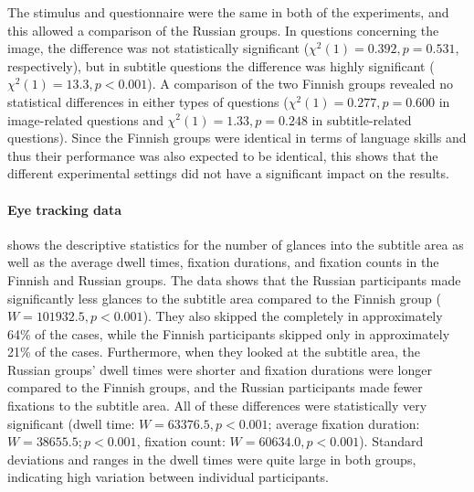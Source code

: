 \documentclass[output=paper]{langsci/langscibook}
\begin{document}
\newpage 
The stimulus and questionnaire were the same in both of the experiments, and this allowed a comparison of the Russian groups. In questions concerning the image, the difference was not statistically significant (${\chi}^2(1) = 0.392, p = 0.531$, respectively), but in subtitle questions the difference was highly significant (${\chi}^2(1) = 13.3, p < 0.001$). A comparison of the two Finnish groups revealed no statistical differences in either types of questions (${\chi}^2(1) = 0.277, p = 0.600$ in image-related questions and ${\chi}^2(1) = 1.33, p = 0.248$ in subtitle-related questions). Since the Finnish groups were identical in terms of language skills and thus their performance was also expected to be identical, this shows that the different experimental settings did not have a significant impact on the results.

\paragraph{Eye tracking data}

   shows the descriptive statistics for the number of glances into the subtitle area as well as the average dwell times, fixation durations, and fixation counts in the Finnish and Russian groups. The data shows that the Russian participants made significantly less glances to the subtitle area compared to the Finnish group ($W = 101932.5, p < 0.001$). They also skipped the  completely in approximately 64\% of the cases, while the Finnish participants skipped  only in approximately 21\% of the cases. Furthermore, when they looked at the subtitle area, the Russian groups' dwell times were shorter and fixation durations were longer compared to the Finnish groups, and the Russian participants made fewer fixations to the subtitle area. All of these differences were statistically very significant (dwell time: $W = 63376.5, p < 0.001$; average fixation duration: $W = 38655.5; p < 0.001$, fixation count: $W = 60634.0, p < 0.001$). Standard deviations and ranges in the dwell times were quite large in both groups, indicating high variation between individual participants.
\end{document}
